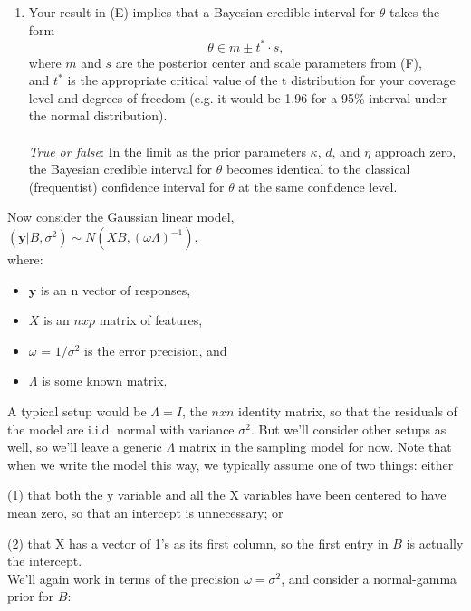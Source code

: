 \documentclass{homework}
\begin{document}
\begin{enumerate}[label=(\Alph*)]
\item Your result in (E) implies that a Bayesian credible interval for $\theta$ takes the form 
$$ \theta \in m \pm t^* \cdot s ,$$ where $m$ and $s$ are the posterior center and scale parameters from (F), \\and $t^*$ is the appropriate critical value of the t distribution for your coverage level and degrees of freedom (e.g. it would be 1.96 for a 95\% interval under the normal distribution).\\ \\
\textit{True or false}: In the limit as the prior parameters $\kappa$, $d$, and $\eta$ approach zero, \\the Bayesian credible interval for $\theta$ becomes identical to the classical (frequentist) confidence interval for $\theta$ at the same confidence level.
\end{enumerate}


Now consider the Gaussian linear model,\\
$( \textbf{y} | B, \sigma^2) \sim N(XB, (\omega\Lambda)^{-1}),$ \\where: 
\begin{itemize}
\item $\textbf{y}$ is an n vector of responses, 
\item $X$ is an $n x p$ matrix of features, 
\item $\omega$ = $1/\sigma^2$ is the error precision, and 
\item $\Lambda$ is some known matrix. 
\end{itemize}
A typical setup would be $\Lambda = I$, the $n x n$ identity matrix, so that the residuals of the model are i.i.d. normal with variance $\sigma^2$. But we'll consider other setups as well, so we'll leave a generic $\Lambda$ matrix in the sampling model for now.  Note that when we write the model this way, we typically assume one of two things: either \par(1) that both the y variable and all the X variables have been centered to have mean zero, so that an intercept is unnecessary; or \par(2) that X has a vector of 1's as its first column, so the first entry in $B$ is actually the intercept.
\\We'll again work in terms of the precision $\omega = \sigma^2$, and consider a normal-gamma prior for $B$:
\end{document}
